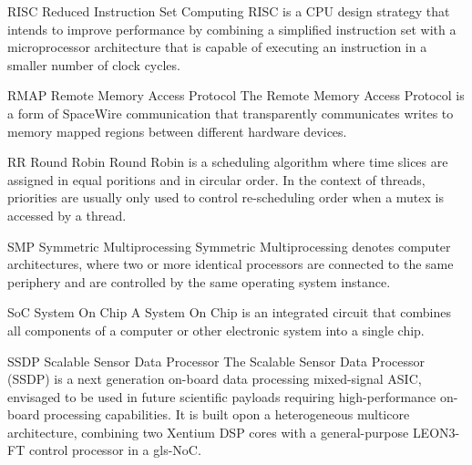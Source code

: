 %
  {RISC}%
  {Reduced Instruction Set Computing}%
  {RISC is a \gls{CPU} design strategy that intends to improve performance by
   combining a simplified instruction set with a microprocessor architecture
   that is capable of executing an instruction in a smaller number of clock
   cycles.}%

%
  {RMAP}%
  {Remote Memory Access Protocol}%
  {The Remote Memory Access Protocol is a form of \gls{SpaceWire} communication
   that transparently communicates writes to memory mapped regions between
   different hardware devices.}%


%
  {RR}%
  {Round Robin}%
  {Round Robin is a scheduling algorithm where time slices are assigned in equal
   poritions and in circular order. In the context of threads, priorities are
   usually only used to control re-scheduling order when a mutex is accessed by
   a thread.}%


%
  {SMP}%
  {Symmetric Multiprocessing}%
  {Symmetric Multiprocessing denotes computer architectures, where two or more
   identical processors are connected to the same periphery and are controlled
   by the same operating system instance.}%

%
  {SoC}%
  {System On Chip}%
  {A System On Chip is an integrated circuit that combines all components of a %
   computer or other electronic system into a single chip.}%



  {SSDP}            %
  {Scalable Sensor Data Processor}  %
  {The Scalable Sensor Data Processor (SSDP) is a next generation on-board %
   data processing mixed-signal ASIC, envisaged to be used in future scientific %
   payloads requiring high-performance on-board processing capabilities. %
   It is built opon a heterogeneous multicore architecture, combining two %
   \gls{Xentium} \gls{DSP} cores with a general-purpose \gls{LEON3-FT} control %
   processor in a \gls{gls-NoC}.} %



